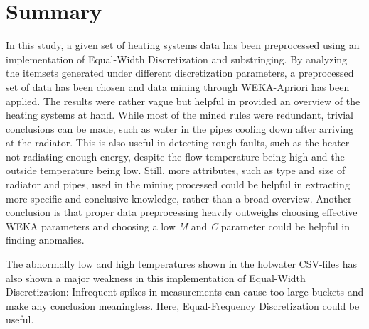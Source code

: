 \documentclass[bachelor,english]{info1thesis}
\begin{document}
\chapter{Summary}
\label{sec:summary}
In this study, a given set of heating systems data has been preprocessed using an implementation of Equal-Width Discretization and substringing. By analyzing the itemsets generated under different discretization parameters, a preprocessed set of data has been chosen and data mining through WEKA-Apriori has been applied. The results were rather vague but helpful in provided an overview of the heating systems at hand. While most of the mined rules were redundant, trivial conclusions can be made, such as water in the pipes cooling down after arriving at the radiator. This is also useful in detecting rough faults, such as the heater not radiating enough energy, despite the flow temperature being high and the outside temperature being low. Still, more attributes, such as type and size of radiator and pipes, used in the mining processed could be helpful in extracting more specific and conclusive knowledge, rather than a broad overview. Another conclusion is that proper data preprocessing heavily outweighs choosing effective WEKA parameters and choosing a low \textit{M} and \textit{C} parameter could be helpful in finding anomalies.

The abnormally low and high temperatures shown in the hotwater CSV-files has also shown a major weakness in this implementation of Equal-Width Discretization: Infrequent spikes in measurements can cause too large buckets and make any conclusion meaningless. Here, Equal-Frequency Discretization could be useful.






\thesisbibliography






\end{document}
